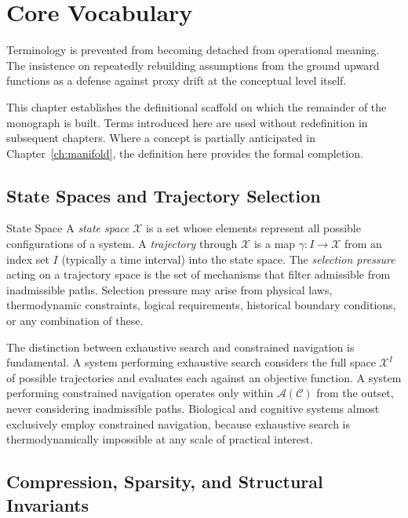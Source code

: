 \chapter{Core Vocabulary}
\label{ch:vocabulary}

\epigraph{Terminology is prevented from becoming detached from operational meaning.
The insistence on repeatedly rebuilding assumptions from the ground upward functions
as a defense against proxy drift at the conceptual level itself.}{}

\noindent This chapter establishes the definitional scaffold on which the remainder of the
monograph is built. Terms introduced here are used without redefinition in subsequent
chapters. Where a concept is partially anticipated in Chapter~\ref{ch:manifold}, the
definition here provides the formal completion.

\section{State Spaces and Trajectory Selection}

\begin{definition}{State Space}
A \emph{state space} $\mathcal{X}$ is a set whose elements represent all possible
configurations of a system. A \emph{trajectory} through $\mathcal{X}$ is a map
$\gamma: I \to \mathcal{X}$ from an index set $I$ (typically a time interval) into
the state space. The \emph{selection pressure} acting on a trajectory space is the
set of mechanisms that filter admissible from inadmissible paths. Selection pressure
may arise from physical laws, thermodynamic constraints, logical requirements,
historical boundary conditions, or any combination of these.
\end{definition}

The distinction between exhaustive search and constrained navigation is fundamental.
A system performing exhaustive search considers the full space $\mathcal{X}^I$ of
possible trajectories and evaluates each against an objective function. A system
performing constrained navigation operates only within $\mathcal{A}(\mathcal{C})$
from the outset, never considering inadmissible paths. Biological and cognitive systems
almost exclusively employ constrained navigation, because exhaustive search is
thermodynamically impossible at any scale of practical interest.

\section{Compression, Sparsity, and Structural Invariants}

